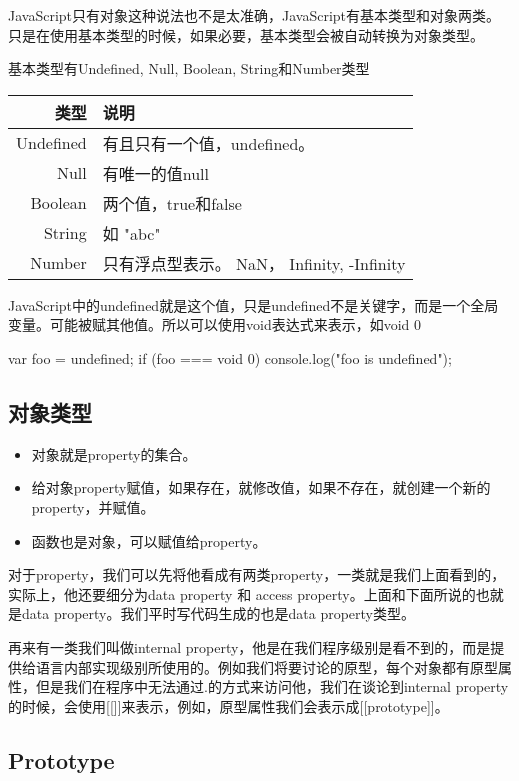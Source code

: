 JavaScript只有对象这种说法也不是太准确，JavaScript有基本类型和对象两类。只是在使用基本类型的时候，如果必要，基本类型会被自动转换为对象类型。

基本类型有Undefined, Null, Boolean, String和Number类型

\begin{tabular}{|r|l|}
\hline
类型 & 说明 \\
\hline
Undefined & 有且只有一个值，undefined。\\
\hline
Null & 有唯一的值null \\
\hline
Boolean & 两个值，true和false \\
\hline
String & 如 "abc" \\
\hline
Number & 只有浮点型表示。 NaN， Infinity, -Infinity \\
\hline
\end{tabular}

JavaScript中的undefined就是这个值，只是undefined不是关键字，而是一个全局变量。可能被赋其他值。所以可以使用void表达式来表示，如void 0 
\begin{JavaScript}
var foo = undefined;
if (foo === void 0) 
{
	console.log("foo is undefined");
}
\end{JavaScript}

\subsection{对象类型}

\begin{itemize}
\item 对象就是property的集合。
\item 给对象property赋值，如果存在，就修改值，如果不存在，就创建一个新的property，并赋值。
\item 函数也是对象，可以赋值给property。
\end{itemize}
	
对于property，我们可以先将他看成有两类property，一类就是我们上面看到的，实际上，他还要细分为data property 和 access property。上面和下面所说的也就是data property。我们平时写代码生成的也是data property类型。
	
再来有一类我们叫做internal property，他是在我们程序级别是看不到的，而是提供给语言内部实现级别所使用的。例如我们将要讨论的原型，每个对象都有原型属性，但是我们在程序中无法通过.的方式来访问他，我们在谈论到internal property的时候，会使用[[]]来表示，例如，原型属性我们会表示成[[prototype]]。
	
\subsection{Prototype}
	
